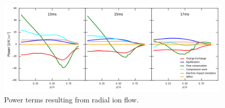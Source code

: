 \begin{figure}
    \centering
    \includegraphics[width = \textwidth]{ion_transport_results/power_terms_no_adhoc.png}
    \caption[Power terms resulting from radial ion flow]{Power terms resulting from radial ion flow.}
    \label{fig:power_terms_no_ahoc}
\end{figure}
